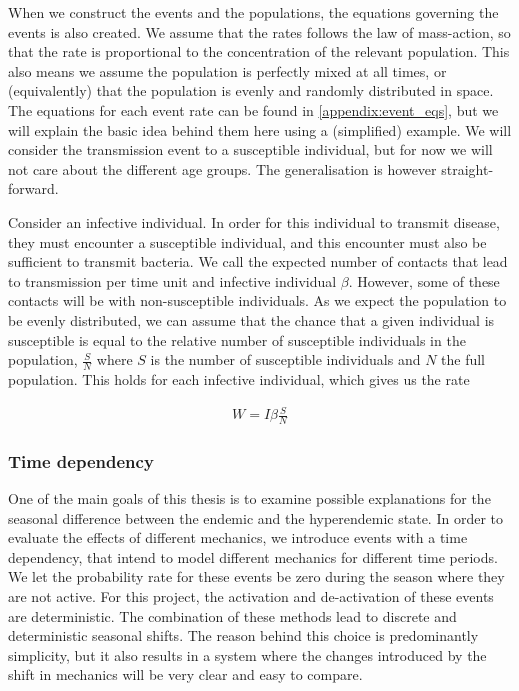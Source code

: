 \documentclass[10pt,a4paper]{article}
\begin{document}
When we construct the events and the populations, the equations governing the events is also created. We assume that the rates follows the law of mass-action, so that the rate is proportional to the concentration of the relevant population. This also means we assume the population is perfectly mixed at all times, or (equivalently) that the population is evenly and randomly distributed in space. The equations for each event rate can be found in \cref{appendix:event_eqs}, but we will explain the basic idea behind them here using a (simplified) example. We will consider the transmission event to a susceptible individual, but for now we will not care about the different age groups. The generalisation is however straight-forward.

Consider an infective individual. In order for this individual to transmit disease, they must encounter a susceptible individual, and this encounter must also be sufficient to transmit bacteria. We call the expected number of contacts that lead to transmission per time unit and infective individual $\beta$. However, some of these contacts will be with non-susceptible individuals. As we expect the population to be evenly distributed, we can assume that the chance that a given individual is susceptible is equal to the relative number of susceptible individuals in the population, $\frac{S}{N}$ where $S$ is the number of susceptible individuals and $N$ the full population. This holds for each infective individual, which gives us the rate

\begin{align}
	W = I \beta \frac{S}{N} \label{eq:rate}
\end{align}

\subsubsection{Time dependency}

One of the main goals of this thesis is to examine possible explanations for the seasonal difference between the endemic and the hyperendemic state. In order to evaluate the effects of different mechanics, we introduce events with a time dependency, that intend to model different mechanics for different time periods. We let the probability rate for these events be zero during the season where they are not active. For this project, the activation and de-activation of these events are deterministic. The combination of these methods lead to discrete and deterministic seasonal shifts. The reason behind this choice is predominantly simplicity, but it also results in a system where the changes introduced by the shift in mechanics will be very clear and easy to compare.
\end{document}

